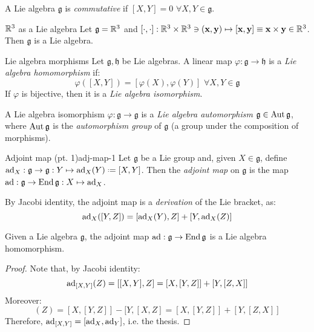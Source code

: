 A Lie algebra $ \mathfrak{g} $ is \textit{commutative} if $ [X,Y] = 0 \,\,\forall X,Y \in \mathfrak{g} $.

\begin{example}{$ \mathbb{R}^3 $ as a Lie algebra}{}
  Let $ \mathfrak{g} = \mathbb{R}^3 $ and $ [\cdot,\cdot] : \mathbb{R}^3 \times \mathbb{R}^3 \ni (\mathbf{x},\mathbf{y}) \mapsto [\mathbf{x} , \mathbf{y}] \equiv \mathbf{x} \times \mathbf{y} \in \mathbb{R}^3 $. Then $ \mathfrak{g} $ is a Lie algebra.
\end{example}

\begin{definition}{Lie algebra morphisms}{}
  Let $ \mathfrak{g} , \mathfrak{h} $ be Lie algebras. A linear map $ \varphi : \mathfrak{g} \rightarrow \mathfrak{h} $ is a \textit{Lie algebra homomorphism} if:
  \begin{equation*}
    \varphi([X,Y]) = [\varphi(X),\varphi(Y)] \,\,\forall X,Y \in \mathfrak{g}
  \end{equation*}
  If $ \varphi $ is bijective, then it is a \textit{Lie algebra isomorphism}.
\end{definition}

A Lie algebra isomorphism $ \varphi : \mathfrak{g} \rightarrow \mathfrak{g} $ is a \textit{Lie algebra automorphism} $ \mathfrak{g} \in \operatorname{Aut}{\mathfrak{g}} $, where $ \operatorname{Aut}{\mathfrak{g}} $ is the \textit{automorphism group} of $ \mathfrak{g} $ (a group under the composition of morphisms).

\begin{definition}{Adjoint map (pt. 1)}{adj-map-1}
  Let $ \mathfrak{g} $ be a Lie group and, given $ X \in \mathfrak{g} $, define $ \ad_X : \mathfrak{g} \rightarrow \mathfrak{g} : Y \mapsto \ad_X(Y) \defeq [X,Y] $. Then the \textit{adjoint map} on $ \mathfrak{g} $ is the map $ \operatorname{ad} : \mathfrak{g} \rightarrow \operatorname{End}{\mathfrak{g}} : X \mapsto \operatorname{ad}_X $.
\end{definition}

By Jacobi identity, the adjoint map is a \textit{derivation} of the Lie bracket, as:
\begin{equation*}
  \operatorname{ad}_X([Y,Z]) = [\operatorname{ad}_X(Y),Z] + [Y,\operatorname{ad}_X(Z)]
\end{equation*}

\begin{proposition}{}{}
  Given a Lie algebra $ \mathfrak{g} $, the adjoint map $ \operatorname{ad} : \mathfrak{g} \rightarrow \operatorname{End}{\mathfrak{g}} $ is a Lie algebra homomorphism.

  \tcblower

  \begin{proof}
    Note that, by Jacobi identity:
    \begin{equation*}
      \operatorname{ad}_{[X,Y]}(Z) = [[X,Y],Z] = [X,[Y,Z]] + [Y,[Z,X]]
    \end{equation*}
    Moreover:
    \begin{equation*}
      [\ad_X,\ad_Y](Z) = [X,[Y,Z]] - [Y,[X,Z] = [X,[Y,Z]] + [Y,[Z,X]]
    \end{equation*}
    Therefore, $ \operatorname{ad}_{[X,Y]} = [\operatorname{ad}_X,\operatorname{ad}_Y] $, i.e. the thesis.
  \end{proof}
\end{proposition}

